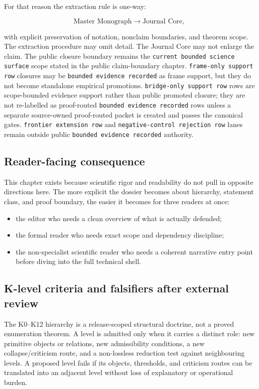 For that reason the extraction rule is one-way:

\[
\text{Master Monograph} \longrightarrow \text{Journal Core},
\]

with explicit preservation of notation, nonclaim boundaries, and theorem scope.
The extraction procedure may omit detail. The Journal Core may not enlarge the
claim.
The public closure boundary remains the
\texttt{current bounded science surface} scope stated in
the public claim-boundary chapter. \texttt{frame-only support row} closures
may be \texttt{bounded evidence recorded} as frame support, but they do not become standalone
empirical promotions. \texttt{bridge-only support row} rows are scope-bounded evidence
support rather than public promoted closure; they are not re-labelled as
proof-routed \texttt{bounded evidence recorded} rows unless a separate source-owned
proof-routed packet is created and passes the canonical gates. \texttt{frontier extension row} and
\texttt{negative-control rejection row} lanes remain outside public \texttt{bounded evidence recorded} authority.

\subsection{Reader-facing consequence}

This chapter exists because scientific rigor and readability do not pull in
opposite directions here.
The more explicit the dossier becomes about hierarchy, statement class, and
proof boundary, the easier it becomes for three readers at once:

\begin{itemize}
\item the editor who needs a clean overview of what is actually defended;
\item the formal reader who needs exact scope and dependency discipline;
\item the non-specialist scientific reader who needs a coherent narrative entry
      point before diving into the full technical shell.
\end{itemize}


\subsection{K-level criteria and falsifiers after external review}
\label{sec:oc13-k-level-criteria-v3}

The K0--K12 hierarchy is a release-scoped structural doctrine, not a proved
enumeration theorem. A level is admitted only when it carries a distinct role:
new primitive objects or relations, new admissibility conditions, a new
collapse/criticism route, and a non-lossless reduction test against neighbouring
levels. A proposed level fails if its objects, thresholds, and criticism routes can
be translated into an adjacent level without loss of explanatory or operational
burden.

